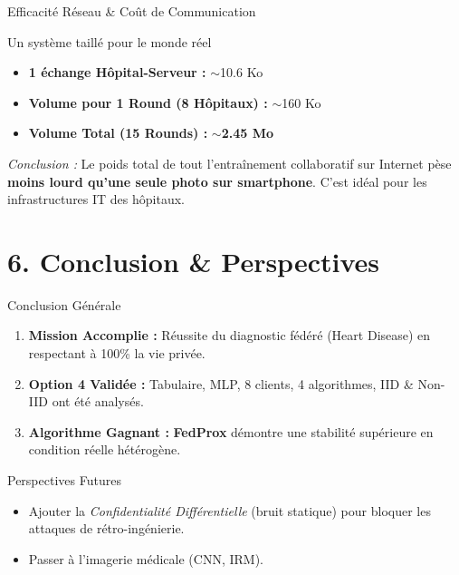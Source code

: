 \documentclass[aspectratio=169,11pt]{beamer}
\begin{document}
\begin{frame}{Efficacit\'{e} R\'{e}seau \& Co\^{u}t de Communication}
  \begin{exampleblock}{Un syst\`{e}me taill\'{e} pour le monde r\'{e}el}
    \begin{itemize}
        \item \textbf{1 \'{e}change H\^{o}pital-Serveur :} $\sim$10.6 Ko
        \item \textbf{Volume pour 1 Round (8 H\^{o}pitaux) :} $\sim$160 Ko
        \item \textbf{Volume Total (15 Rounds) :} \textbf{$\sim$2.45 Mo}
    \end{itemize}
  \end{exampleblock}
  \vspace{0.4cm}
  \textit{Conclusion :} Le poids total de tout l'entra\^{i}nement collaboratif sur Internet p\`{e}se \textbf{moins lourd qu'une seule photo sur smartphone}. C'est id\'{e}al pour les infrastructures IT des h\^{o}pitaux.
\end{frame}

\section{6. Conclusion \& Perspectives}

\begin{frame}{Conclusion G\'{e}n\'{e}rale}
  \begin{enumerate}
    \item \textbf{Mission Accomplie :} R\'{e}ussite du diagnostic f\'{e}d\'{e}r\'{e} (Heart Disease) en respectant \`{a} 100\% la vie priv\'{e}e.
    \item \textbf{Option 4 Valid\'{e}e :} Tabulaire, MLP, 8 clients, 4 algorithmes, IID \& Non-IID ont \'{e}t\'{e} analys\'{e}s.
    \item \textbf{Algorithme Gagnant :} \textbf{FedProx} d\'{e}montre une stabilit\'{e} sup\'{e}rieure en condition r\'{e}elle h\'{e}t\'{e}rog\`{e}ne.
  \end{enumerate}
  \vspace{0.4cm}
  \begin{block}{Perspectives Futures}
    \begin{itemize}
        \item Ajouter la \emph{Confidentialit\'{e} Diff\'{e}rentielle} (bruit statique) pour bloquer les attaques de r\'{e}tro-ing\'{e}nierie.
        \item Passer \`{a} l'imagerie m\'{e}dicale (CNN, IRM).
    \end{itemize}
  \end{block}
\end{frame}
\end{document}
